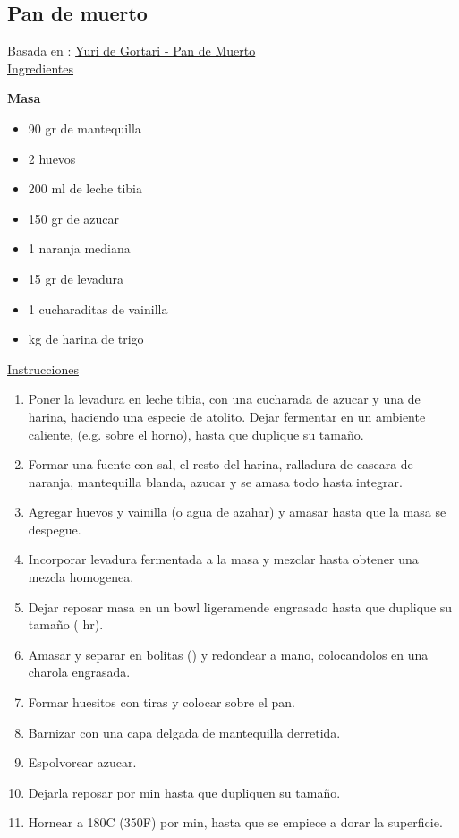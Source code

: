 \subsection{Pan de muerto}

Basada en : \href{https://www.youtube.com/watch?v=PnYVBsY-xAk}{Yuri de Gortari - Pan de Muerto}\\

\underline{Ingredientes}

\textbf{Masa}
\begin{itemize}
\item 90 gr de mantequilla
\item 2 huevos
\item 200 ml de leche tibia
\item 150 gr de azucar
\item 1 naranja mediana
\item 15 gr de levadura
\item 1 cucharaditas de vainilla
\item {} kg de harina de trigo
\end{itemize}

\underline{Instrucciones}
\begin{enumerate}
\item Poner la levadura en leche tibia, con una cucharada de azucar y una de harina, haciendo una especie de atolito. Dejar fermentar en un ambiente caliente, (e.g. sobre el horno), hasta que duplique su tamaño.
\item Formar una fuente con sal, el resto del harina, ralladura de cascara de naranja, mantequilla blanda, azucar y se amasa todo hasta integrar.
\item Agregar huevos y vainilla (o agua de azahar) y amasar hasta que la masa se despegue.
\item Incorporar levadura fermentada a la masa y mezclar hasta obtener una mezcla homogenea.
\item Dejar reposar masa en un bowl ligeramende engrasado hasta que duplique su tamaño ( hr).
\item Amasar y separar en bolitas () y redondear a mano, colocandolos en una charola engrasada.
\item Formar huesitos con tiras y colocar sobre el pan.
\item Barnizar con una capa delgada de mantequilla derretida.
\item Espolvorear azucar.
\item Dejarla reposar por  min hasta que dupliquen su tamaño. 
\item Hornear a 180C (350F) por  min, hasta que se empiece a dorar la superficie.
\end{enumerate}
